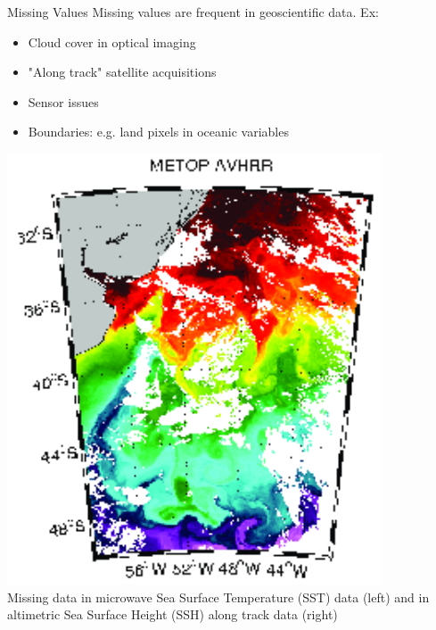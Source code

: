 \documentclass{beamer}
\begin{document}
\begin{frame}{Missing Values}
Missing values are frequent in geoscientific data. Ex:
\begin{itemize}
\item Cloud cover in optical imaging
\item "Along track" satellite acquisitions
\item Sensor issues
\item Boundaries: e.g. land pixels in oceanic variables
\end{itemize}

\begin{center}
\includegraphics[scale=1.2]{sst_ex.png}
\\
\tiny{Missing data in microwave Sea Surface Temperature (SST) data (left) and in altimetric Sea Surface Height (SSH) along track data (right)}
\end{center}

\end{frame}
\end{document}
